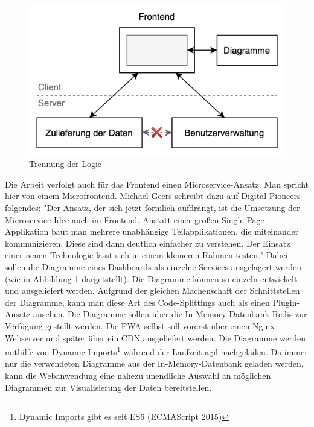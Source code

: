 \begin{figure}
    \begin{center}
    \includegraphics[scale=0.2]{img/abbildungen/TrennungDerLogic}
    \end{center}
    \caption{Trennung der Logic}
    \label{figure:trennungderlogic}
\end{figure}

Die Arbeit verfolgt auch für das Frontend einen Microservice-Ansatz. Man spricht hier von einem
Microfrontend. Michael Geers schreibt dazu auf Digital Pioneers folgendes:
"Der Ansatz, der sich jetzt förmlich aufdrängt, ist die Umsetzung der Microservice-Idee
auch im Frontend. Anstatt einer ­großen Single-Page-Applikation baut man mehrere unabhängige
Teilapplikationen, die miteinander kommunizieren. Diese sind dann deutlich einfacher zu verstehen.
Der Einsatz einer neuen Technologie lässt sich in einem kleineren Rahmen testen."\cite{MicrofrontendT3N}
Dabei sollen die Diagramme eines Dashboards als einzelne Services ausgelagert werden (wie in Abbildung \ref{figure:trennungderlogic} dargetstellt).
Die Diagramme können so einzeln entwickelt und ausgeliefert werden. Aufgrund der
gleichen Machenschaft der Schnittstellen der Diagramme, kann man diese Art des Code-Splittings auch als
einen Plugin-Ansatz ansehen. Die Diagramme sollen über die In-Memory-Datenbank
Redis zur Verfügung gestellt werden. Die PWA selbst soll vorerst über einen
Nginx Webserver und später über ein CDN ausgeliefert werden. Die Diagramme werden mithilfe
von Dynamic Imports\footnote{Dynamic Imports gibt es seit ES6 (ECMAScript 2015)\cite{DynamicImportsV8}}
während der Laufzeit agil nachgeladen. Da immer nur die verwendeten Diagramme aus der In-Memory-Datenbank
geladen werden, kann die Webanwendung eine nahezu unendliche Auswahl an möglichen Diagrammen zur Visualisierung
der Daten bereitstellen.


